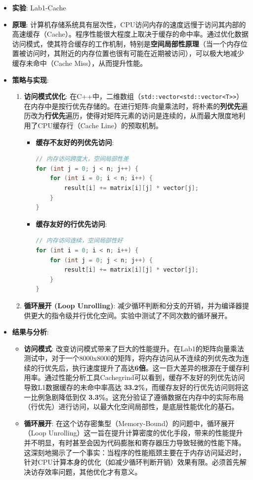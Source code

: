 \documentclass[a4paper]{article}
\begin{document}
\begin{itemize}
    \item \textbf{实验}: Lab1-Cache
    \item \textbf{原理}: 计算机存储系统具有层次性，CPU访问内存的速度远慢于访问其内部的高速缓存（Cache）。程序性能很大程度上取决于缓存的命中率。通过优化数据访问模式，使其符合缓存的工作机制，特别是\textbf{空间局部性原理}（当一个内存位置被访问时，其附近的内存位置也很有可能在近期被访问），可以极大地减少缓存未命中（Cache Miss），从而提升性能。
    \item \textbf{策略与实现}:
    \begin{enumerate}
        \item \textbf{访问模式优化}: 在C++中，二维数组（\texttt{std::vector<std::vector<T>>}）在内存中是按行优先存储的。在进行矩阵-向量乘法时，将朴素的\textbf{列优先}遍历改为\textbf{行优先}遍历，使得对矩阵元素的访问是连续的，从而最大限度地利用了CPU缓存行（Cache Line）的预取机制。
        \begin{itemize}
            \item \textbf{缓存不友好的列优先访问}:
            \begin{lstlisting}[language=C++]
// 内存访问跨度大，空间局部性差
for (int j = 0; j < n; j++) {
    for (int i = 0; i < n; i++) {
        result[i] += matrix[i][j] * vector[j];
    }
}
            \end{lstlisting}
            \item \textbf{缓存友好的行优先访问}:
            \begin{lstlisting}[language=C++]
// 内存访问连续，空间局部性好
for (int i = 0; i < n; i++) {
    for (int j = 0; j < n; j++) {
        result[i] += matrix[i][j] * vector[j];
    }
}
            \end{lstlisting}
        \end{itemize}
        \item \textbf{循环展开 (Loop Unrolling)}: 减少循环判断和分支的开销，并为编译器提供更大的指令级并行优化空间。实验中测试了不同次数的循环展开。
    \end{enumerate}
    \item \textbf{结果与分析}:
    \begin{itemize}
        \item \textbf{访问模式}: 改变访问模式带来了巨大的性能提升。在Lab1的矩阵向量乘法测试中，对于一个8000x8000的矩阵，将内存访问从不连续的列优先改为连续的行优先后，执行速度提升了高达\textbf{6倍}。这一巨大差异的根源在于缓存利用率。通过性能分析工具Cachegrind可以看到，缓存不友好的列优先访问导致L1数据缓存的未命中率高达 \textbf{33.2\%}，而缓存友好的行优先访问则将这一比例急剧降低到仅 \textbf{3.3\%}。这充分验证了遵循数据在内存中的实际布局（行优先）进行访问，以最大化空间局部性，是底层性能优化的基石。
        \item \textbf{循环展开}: 在这个访存密集型（Memory-Bound）的问题中，循环展开（Loop Unrolling）这一旨在提升计算密度的优化手段，带来的性能提升并不明显，有时甚至会因为代码膨胀和寄存器压力导致轻微的性能下降。这深刻地揭示了一个事实：当程序的性能瓶颈主要在于内存访问延迟时，针对CPU计算本身的优化（如减少循环判断开销）效果有限。必须首先解决访存效率问题，其他优化才有意义。
    \end{itemize}
\end{itemize}
\end{document}
